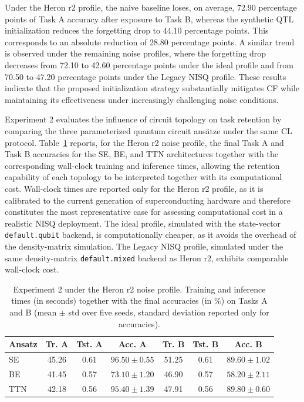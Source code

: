\documentclass[conference]{IEEEtran}
\begin{document}
Under the Heron r2 profile, the naive baseline loses, on average, 72.90 percentage points of Task A accuracy after exposure to Task B, whereas the synthetic QTL initialization reduces the forgetting drop to 44.10 percentage points. This corresponds to an absolute reduction of 28.80 percentage points. A similar trend is observed under the remaining noise profiles, where the forgetting drop decreases from 72.10 to 42.60 percentage points under the ideal profile and from 70.50 to 47.20 percentage points under the Legacy NISQ profile. These results indicate that the proposed initialization strategy substantially mitigates CF while maintaining its effectiveness under increasingly challenging noise conditions.

Experiment 2 evaluates the influence of circuit topology on task retention by comparing the three parameterized quantum circuit ans\"atze under the same CL protocol. Table~\ref{tab:exp2time} reports, for the Heron r2 noise profile, the final Task A and Task B accuracies for the SE, BE, and TTN architectures together with the corresponding wall-clock training and inference times, allowing the retention capability of each topology to be interpreted together with its computational cost. Wall-clock times are reported only for the Heron r2 profile, as it is calibrated to the current generation of superconducting hardware and therefore constitutes the most representative case for assessing computational cost in a realistic NISQ deployment. The ideal profile, simulated with the state-vector \texttt{default.qubit} backend, is computationally cheaper, as it avoids the overhead of the density-matrix simulation. The Legacy NISQ profile, simulated under the same density-matrix \texttt{default.mixed} backend as Heron r2, exhibits comparable wall-clock cost.

\begin{table}[ht]
\caption{Experiment 2 under the Heron r2 noise profile. Training and inference times (in seconds) together with the final accuracies (in \%) on Tasks A and B (mean $\pm$ std over five seeds, standard deviation reported only for accuracies).}
\label{tab:exp2time}
\centering
\begin{tabular}{lcccccc}
\toprule
Ansatz & Tr. A & Tst. A & Acc. A & Tr. B & Tst. B & Acc. B \\
\midrule
SE & 45.26 & 0.61 & $96.50 \pm 0.55$ & 51.25 & 0.61 & $89.60 \pm 1.02$ \\
BE & 41.45 & 0.57 & $73.10 \pm 1.20$ & 46.90 & 0.57 & $58.20 \pm 2.11$ \\
TTN & 42.18 & 0.56 & $95.40 \pm 1.39$ & 47.91 & 0.56 & $89.80 \pm 0.60$ \\
\bottomrule
\end{tabular}
\end{table}
\end{document}
